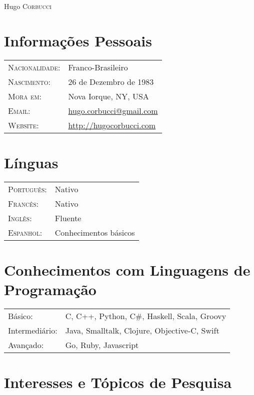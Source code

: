 \documentclass[letter,10pt]{article}
\begin{document}
\par{\centering
		{\Huge Hugo \textsc{Corbucci}
	}\bigskip\par}

\section{Informações Pessoais}

\begin{tabular}{p{2.5cm}l}
  \textsc{Nacionalidade:} & Franco-Brasileiro
  \\
  \textsc{Nascimento:} & 26 de Dezembro de 1983\\
  \textsc{Mora em:}   & Nova Iorque, NY, USA \\
  \textsc{Email:}     &
  \href{mailto:hugo.corbucci@gmail.com}{hugo.corbucci@gmail.com}\\
  \textsc{Website:} & \href{http://hugocorbucci.com}{http://hugocorbucci.com}
\end{tabular}

\section{Línguas}
\begin{tabular}{p{2.5cm}l}
 \textsc{Português:}&Nativo\\
 \textsc{Francês:}&Nativo\\
 \textsc{Inglês:}&Fluente\\
 \textsc{Espanhol:}&Conhecimentos básicos\\
\end{tabular}

\section{Conhecimentos com Linguagens de Programação}
\begin{tabular}{p{2.5cm}l}
 Básico:& C, C++, Python, C\#, Haskell, Scala, Groovy\\
 Intermediário:& Java, Smalltalk, Clojure, Objective-C, Swift\\
 Avançado:& Go, Ruby, Javascript\\
\end{tabular}

\section{Interesses e Tópicos de Pesquisa}
\end{document}
